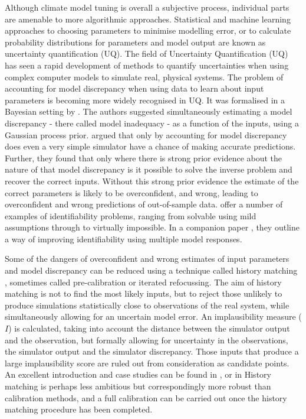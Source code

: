 \documentclass[gmd, manuscript]{copernicus}
\begin{document}
Although climate model tuning is overall a subjective process, individual parts are amenable to more algorithmic approaches. Statistical and machine learning approaches to choosing parameters to minimise modelling error, or to calculate probability distributions for parameters and model output are known as uncertainty quantification (UQ). The field of Uncertainty Quantification (UQ) has seen a rapid development of methods to quantify uncertainties when using complex computer models to simulate real, physical systems. The problem of accounting for model discrepancy when using data to learn about input parameters is becoming more widely recognised in UQ. It was formalised in a Bayesian setting by \cite{kennedy2001bayesian}. The authors suggested simultaneously estimating a model discrepancy  - there called model inadequacy - as a function of the inputs, using a Gaussian process prior. \cite{brynjarsdottir2014learning} argued that only by accounting for model discrepancy does even a very simple simulator have a chance of making accurate predictions. Further, they found that only where there is strong prior evidence about the nature of that model discrepancy is it possible to solve the inverse problem and recover the correct inputs. Without this strong prior evidence the estimate of the correct parameters is likely to be overconfident, and wrong, leading to overconfident and wrong predictions of out-of-sample data. \cite{arendt2012quantification} offer a number of examples of identifiability problems, ranging from solvable using mild assumptions through to virtually impossible. In a companion paper \citep{arendt2012improving}, they outline a way of improving identifiability using multiple model responses. 

Some of the dangers of overconfident and wrong estimates of input parameters and model discrepancy can be reduced using a technique called history matching \citep{craig1996strategies}, sometimes called pre-calibration or iterated refocussing. The aim of history matching is not to find the most likely inputs, but to reject those unlikely to produce simulations statistically close to observations of the real system, while simultaneously allowing for an uncertain model error. An implausibility measure ($I$) is calculated, taking into account the distance between the simulator output and the observation, but formally allowing for uncertainty in the observations, the simulator output and the simulator discrepancy. Those inputs that produce a large implausibility score are ruled out from consideration as candidate points. An excellent introduction and case studies can be found in \cite{andrianakis2015bayesian}, or in \cite{vernon2010galaxy} History matching is perhaps less ambitious but correspondingly more robust than calibration methods, and a full calibration can be carried out once the history matching procedure has been completed.
\end{document}
